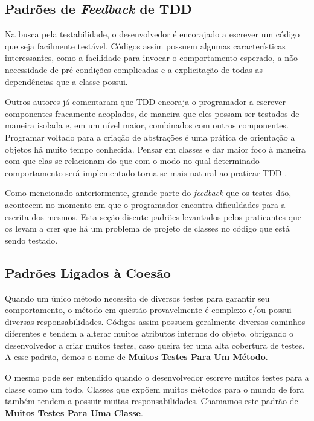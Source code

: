 \documentclass[conference]{IEEEtran}
\begin{document}
\subsection{Padrões de \textit{Feedback} de TDD}
\label{padroes-tdd}

Na busca pela testabilidade, o desenvolvedor é encorajado a escrever um
código que seja facilmente testável. Códigos assim possuem algumas
características interessantes, como a facilidade para invocar o comportamento
esperado, a não necessidade de pré-condições complicadas e a explicitação de
todas as dependências que a classe possui.

Outros autores já comentaram que 
TDD encoraja o programador a escrever componentes fracamente acoplados, de
maneira que eles possam ser testados de maneira isolada e, em um nível maior,
combinados com outros componentes.
Programar voltado para a criação de abstrações é uma prática de orientação a objetos há muito
tempo conhecida. Pensar em classes e dar maior foco à maneira com que
elas se relacionam do que com o modo no qual determinado comportamento será implementado
torna-se mais natural ao praticar TDD \cite{GOOS}. 

Como mencionado anteriormente, grande parte do \textit{feedback} que os testes
dão, acontecem no momento em que o programador encontra dificuldades para a
escrita dos mesmos. Esta seção discute padrões levantados pelos praticantes
que os levam a crer que há um problema de projeto de classes no código
que está sendo testado.

\subsection{Padrões Ligados à Coesão}

Quando um único método necessita de diversos testes para garantir seu comportamento,
o método em questão provavelmente é complexo e/ou possui diversas responsabilidades.
Códigos assim possuem geralmente diversos caminhos
diferentes e tendem a alterar muitos atributos internos do objeto, obrigando o desenvolvedor
a criar muitos testes, caso queira ter uma alta cobertura de testes.
A esse padrão, demos o nome de \textbf{Muitos Testes Para Um Método}.

O mesmo pode ser entendido quando o desenvolvedor escreve muitos testes para a 
classe como um todo. Classes que expõem muitos métodos para o mundo de fora
também tendem a possuir muitas responsabilidades. Chamamos este padrão
de \textbf{Muitos Testes Para Uma Classe}.
\end{document}
